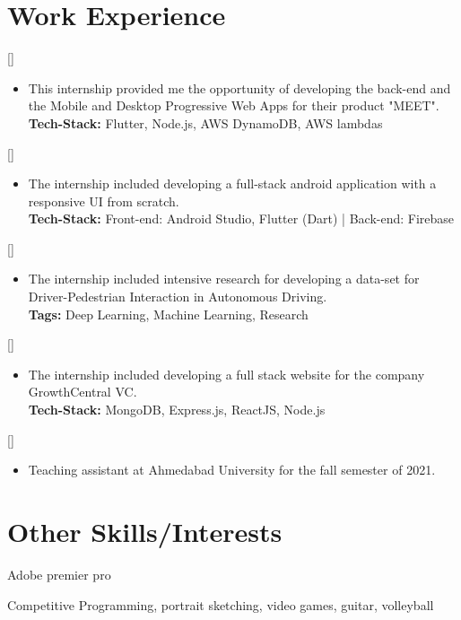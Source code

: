 \documentclass{article}
\begin{document}
\section{Work Experience}

[]
\begin{itemize}
    \item This internship provided me the opportunity of developing the back-end and the Mobile and Desktop Progressive Web Apps for their product "MEET".\\
\textbf{Tech-Stack:} Flutter, Node.js, AWS DynamoDB, AWS lambdas 

\end{itemize}

[]
\begin{itemize}
    \item The internship included developing a full-stack android application with a responsive UI from scratch.\\
\textbf{Tech-Stack:} 
Front-end: Android Studio, Flutter (Dart) | Back-end: Firebase
\end{itemize}
[]
\begin{itemize}
    \item The internship included intensive research for developing a data-set for Driver-Pedestrian Interaction in Autonomous Driving.\\
\textbf{Tags:} Deep Learning, Machine Learning, Research

\end{itemize}

[]
\begin{itemize}
    \item The internship included developing a full stack website for the company GrowthCentral VC.\\
\textbf{Tech-Stack:} MongoDB, Express.js, ReactJS, Node.js

\end{itemize}
[]
\begin{itemize}
    \item Teaching assistant at Ahmedabad University for the fall semester of 2021.
\end{itemize}

\section{Other Skills/Interests}
\begin{description}[widest=Langauges]
\item[Software]     Adobe premier pro
\item[Interests] Competitive Programming, portrait sketching, video games, guitar, volleyball
\end{description}
\end{document}
